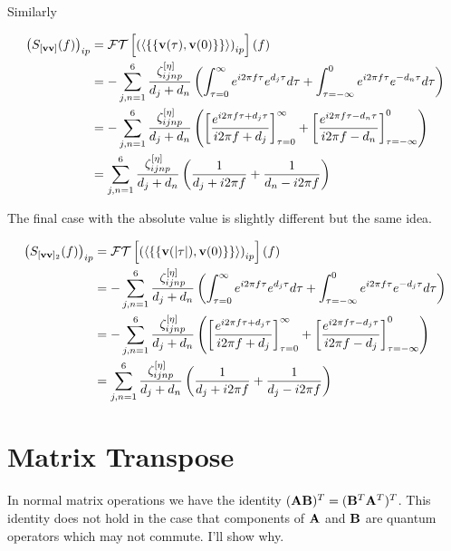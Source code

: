 \documentclass[12pt]{article}
\newcommand{\bv}[1]{\bold{#1}}
\begin{document}
Similarly

\begin{align}
\left(S_{[\bv{v}\bv{v}]}(f)\right)_{ip} &= \mathcal{FT}\left[\left(\Braket{\left\{\left\{\bv{v}(\tau),\bv{v}(0)\right\}\right\}}\right)_{ip}\right](f)\\
&=-\sum_{j,n=1}^6 \frac{\zeta_{ijnp}^{[\eta]}}{d_j+d_n} \left(\int_{\tau = 0}^{\infty} e^{i 2\pi f \tau} e^{d_j \tau} d\tau + \int_{\tau = -\infty}^{0} e^{i 2\pi f \tau} e^{-d_n \tau} d\tau \right)\\
&= -\sum_{j,n=1}^6 \frac{\zeta_{ijnp}^{[\eta]}}{d_j+d_n} \left(\left[\frac{e^{i2\pi f \tau + d_j \tau}}{i 2\pi f + d_j}\right]_{\tau=0}^{\infty} + \left[\frac{e^{i2\pi f \tau - d_n \tau}}{i 2\pi f - d_n} \right]_{\tau=-\infty}^0\right)\\
&= \sum_{j,n=1}^6 \frac{\zeta_{ijnp}^{[\eta]}}{d_j+d_n} \left(\frac{1}{d_j + i 2\pi f} + \frac{1}{d_n - i 2\pi f} \right)
\end{align}

The final case with the absolute value is slightly different but the same idea.

\begin{align}
\left(S_{[\bv{v}\bv{v}]_2}(f)\right)_{ip} &= \mathcal{FT}\left[\left(\Braket{\left\{\left\{\bv{v}(\lvert\tau\rvert),\bv{v}(0)\right\}\right\}}\right)_{ip}\right](f)\\
&=-\sum_{j,n=1}^6 \frac{\zeta_{ijnp}^{[\eta]}}{d_j+d_n} \left(\int_{\tau = 0}^{\infty} e^{i 2\pi f \tau} e^{d_j \tau} d\tau + \int_{\tau = -\infty}^{0} e^{i 2\pi f \tau} e^{-d_j \tau} d\tau \right)\\
&= -\sum_{j,n=1}^6 \frac{\zeta_{ijnp}^{[\eta]}}{d_j+d_n} \left(\left[\frac{e^{i2\pi f \tau + d_j \tau}}{i 2\pi f + d_j}\right]_{\tau=0}^{\infty} + \left[\frac{e^{i2\pi f \tau - d_j \tau}}{i 2\pi f - d_j} \right]_{\tau=-\infty}^0\right)\\
&= \sum_{j,n=1}^6 \frac{\zeta_{ijnp}^{[\eta]}}{d_j+d_n} \left(\frac{1}{d_j + i 2\pi f} + \frac{1}{d_j - i 2\pi f} \right)
\end{align}

\section{Matrix Transpose}

In normal matrix operations we have the identity $(\bv{A}\bv{B})^T = (\bv{B}^T\bv{A}^T)^T$. This identity does not hold in the case that components of $\bv{A}$ and $\bv{B}$ are quantum operators which may not commute. I'll show why.
\end{document}
